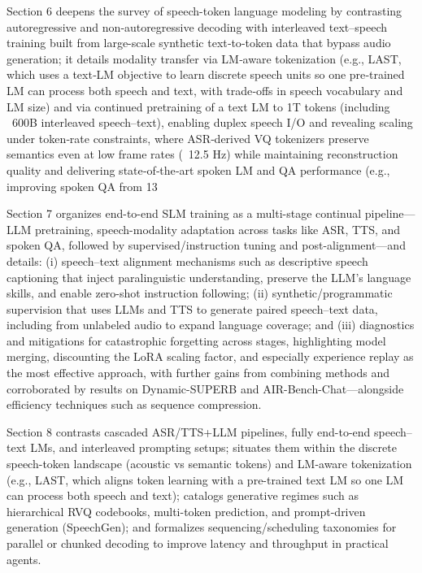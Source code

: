 \documentclass{article}
\begin{document}
Section 6 deepens the survey of speech-token language modeling by contrasting autoregressive and non‑autoregressive decoding with interleaved text–speech training built from large-scale synthetic text‑to‑token data that bypass audio generation; it details modality transfer via LM‑aware tokenization (e.g., LAST, which uses a text‑LM objective to learn discrete speech units so one pre‑trained LM can process both speech and text, with trade‑offs in speech vocabulary and LM size) and via continued pretraining of a text LM to 1T tokens (including ~600B interleaved speech–text), enabling duplex speech I/O and revealing scaling under token‑rate constraints, where ASR‑derived VQ tokenizers preserve semantics even at low frame rates (~12.5 Hz) while maintaining reconstruction quality and delivering state‑of‑the‑art spoken LM and QA performance (e.g., improving spoken QA from 13%



Section 7 organizes end-to-end SLM training as a multi-stage continual pipeline—LLM pretraining, speech-modality adaptation across tasks like ASR, TTS, and spoken QA, followed by supervised/instruction tuning and post-alignment—and details: (i) speech–text alignment mechanisms such as descriptive speech captioning that inject paralinguistic understanding, preserve the LLM’s language skills, and enable zero-shot instruction following; (ii) synthetic/programmatic supervision that uses LLMs and TTS to generate paired speech–text data, including from unlabeled audio to expand language coverage; and (iii) diagnostics and mitigations for catastrophic forgetting across stages, highlighting model merging, discounting the LoRA scaling factor, and especially experience replay as the most effective approach, with further gains from combining methods and corroborated by results on Dynamic-SUPERB and AIR-Bench-Chat—alongside efficiency techniques such as sequence compression. \cite{noroozi2024instructiondatagenerationunsupervisedada,hsiao2025analyzingmitigationstrategiescatastrophi,lu2024destaenhancingspeechlanguagemodelsthroug,lu2025desta2developinginstructionfollowingspee} 



Section 8 contrasts cascaded ASR/TTS+LLM pipelines, fully end-to-end speech–text LMs, and interleaved prompting setups; situates them within the discrete speech-token landscape (acoustic vs semantic tokens) and LM-aware tokenization (e.g., LAST, which aligns token learning with a pre-trained text LM so one LM can process both speech and text); catalogs generative regimes such as hierarchical RVQ codebooks, multi-token prediction, and prompt-driven generation (SpeechGen); and formalizes sequencing/scheduling taxonomies for parallel or chunked decoding to improve latency and throughput in practical agents. \cite{turetzky2024lastlanguagemodelawarespeechtokenization,wu2023speechgenunlockinggenerativepowerspeechl,guo2025recentadvancesdiscretespeechtokensreview} 
\end{document}
